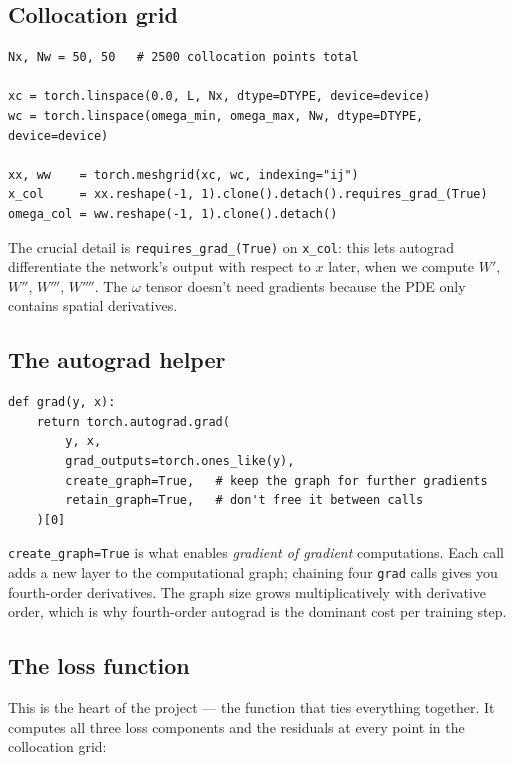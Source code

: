 \documentclass[11pt,a4paper]{article}
\begin{document}
\subsection{Collocation grid}

\begin{lstlisting}[caption={Building the collocation grid}]
Nx, Nw = 50, 50   # 2500 collocation points total

xc = torch.linspace(0.0, L, Nx, dtype=DTYPE, device=device)
wc = torch.linspace(omega_min, omega_max, Nw, dtype=DTYPE, device=device)

xx, ww    = torch.meshgrid(xc, wc, indexing="ij")
x_col     = xx.reshape(-1, 1).clone().detach().requires_grad_(True)
omega_col = ww.reshape(-1, 1).clone().detach()
\end{lstlisting}

The crucial detail is \texttt{requires\_grad\_(True)} on \texttt{x\_col}: this lets autograd differentiate the network's output with respect to $x$ later, when we compute $W'$, $W''$, $W'''$, $W''''$. The $\omega$ tensor doesn't need gradients because the PDE only contains spatial derivatives.

\subsection{The autograd helper}

\begin{lstlisting}[caption={Helper for taking gradients of gradients}]
def grad(y, x):
    return torch.autograd.grad(
        y, x,
        grad_outputs=torch.ones_like(y),
        create_graph=True,   # keep the graph for further gradients
        retain_graph=True,   # don't free it between calls
    )[0]
\end{lstlisting}

\texttt{create\_graph=True} is what enables \emph{gradient of gradient} computations. Each call adds a new layer to the computational graph; chaining four \texttt{grad} calls gives you fourth-order derivatives. The graph size grows multiplicatively with derivative order, which is why fourth-order autograd is the dominant cost per training step.

\subsection{The loss function}

This is the heart of the project --- the function that ties everything together. It computes all three loss components and the residuals at every point in the collocation grid:
\end{document}
